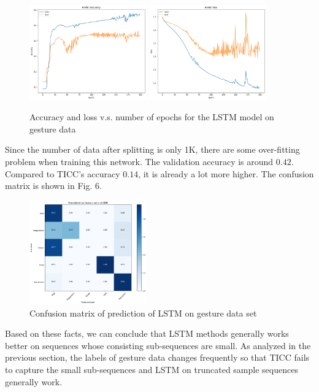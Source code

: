 \documentclass{llncs}
\begin{document}
\begin{figure}[H]
	\centering
	\includegraphics[width=0.45\textwidth]{LSTM_Accuracy_GD.png}
	\includegraphics[width=0.45\textwidth]{LSTM_Loss_GD.png}
	\caption{Accuracy and loss v.s. number of epochs for the LSTM model on gesture data}
	\label{fig:learning_curve}
\end{figure}

Since the number of data after splitting is only 1K, there are some over-fitting problem when training this network. The validation accuracy is around $0.42$. Compared to TICC's accuracy $0.14$, it is already a lot more higher. The confusion matrix is shown in Fig. 6.

\begin{figure}[H]
	\centering
	\includegraphics[width=0.45\textwidth]{LSTM_CFM_GD.png}
	\caption{Confusion matrix of prediction of LSTM on gesture data set}
	\label{fig:LSTM_CFM}
\end{figure}

Based on these facts, we can conclude that LSTM methods generally works better on sequences whose consisting sub-sequences are small. As analyzed in the previous section, the labels of gesture data changes frequently so that TICC fails to capture the small sub-sequences and LSTM on truncated sample sequences generally work.
\end{document}
